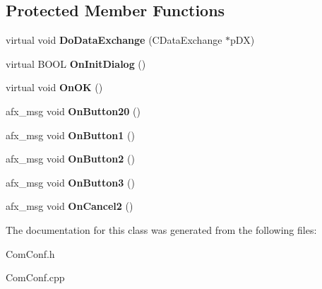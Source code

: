 \subsection*{Protected Member Functions}
\begin{DoxyCompactItemize}
\item 
\hypertarget{class_c_com_conf_a9df649a7e34b16d447b328322904beaa}{virtual void {\bfseries Do\-Data\-Exchange} (C\-Data\-Exchange $\ast$p\-D\-X)}\label{class_c_com_conf_a9df649a7e34b16d447b328322904beaa}

\item 
\hypertarget{class_c_com_conf_aa5aa1d233cfc65c3eb459903f27a2718}{virtual B\-O\-O\-L {\bfseries On\-Init\-Dialog} ()}\label{class_c_com_conf_aa5aa1d233cfc65c3eb459903f27a2718}

\item 
\hypertarget{class_c_com_conf_aee8b247e513c30c62b7efb3a53b46486}{virtual void {\bfseries On\-O\-K} ()}\label{class_c_com_conf_aee8b247e513c30c62b7efb3a53b46486}

\item 
\hypertarget{class_c_com_conf_a3227cb19597f1fd7ad467ed3ae000f6d}{afx\-\_\-msg void {\bfseries On\-Button20} ()}\label{class_c_com_conf_a3227cb19597f1fd7ad467ed3ae000f6d}

\item 
\hypertarget{class_c_com_conf_a677a8476b3de8d49c1d6bdb4c9ae6bda}{afx\-\_\-msg void {\bfseries On\-Button1} ()}\label{class_c_com_conf_a677a8476b3de8d49c1d6bdb4c9ae6bda}

\item 
\hypertarget{class_c_com_conf_a31bfc5334b42dba4f88cbb6aa964ab12}{afx\-\_\-msg void {\bfseries On\-Button2} ()}\label{class_c_com_conf_a31bfc5334b42dba4f88cbb6aa964ab12}

\item 
\hypertarget{class_c_com_conf_aa5a9ded50d3c032d640c034c041abda3}{afx\-\_\-msg void {\bfseries On\-Button3} ()}\label{class_c_com_conf_aa5a9ded50d3c032d640c034c041abda3}

\item 
\hypertarget{class_c_com_conf_a6e144aff1e4305b0070d33e2e83d343a}{afx\-\_\-msg void {\bfseries On\-Cancel2} ()}\label{class_c_com_conf_a6e144aff1e4305b0070d33e2e83d343a}

\end{DoxyCompactItemize}


The documentation for this class was generated from the following files\-:\begin{DoxyCompactItemize}
\item 
Com\-Conf.\-h\item 
Com\-Conf.\-cpp\end{DoxyCompactItemize}
